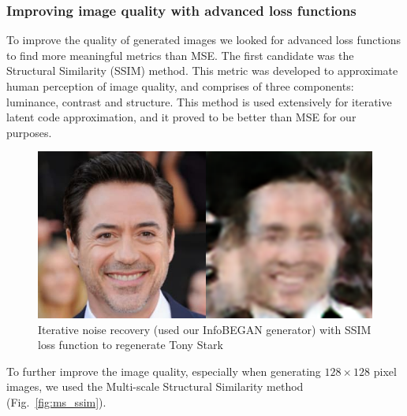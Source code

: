 \documentclass{egpubl}
\begin{document}
\subsubsection{Improving image quality with advanced loss functions}

To improve the quality of generated images we looked for advanced loss functions to find more meaningful metrics than MSE.
The first candidate was the Structural Similarity (SSIM) method. This metric was developed to approximate human perception of image quality, %
and comprises of three components: luminance, contrast and structure. This method is used extensively for iterative latent code approximation, %
and it proved to be better than MSE for our purposes.

\begin{figure}[!htb]
	\centering
	\includegraphics[width=1\linewidth]{pic/InfoBEGAN_tony_recovered_ssim}
	\caption{Iterative noise recovery (used our InfoBEGAN generator) with SSIM loss function to regenerate Tony Stark}

\end{figure}

To further improve the image quality, especially when generating $128\times 128$ pixel images, we used the Multi-scale Structural Similarity method (Fig.~\ref{fig:ms_ssim}).
\end{document}
